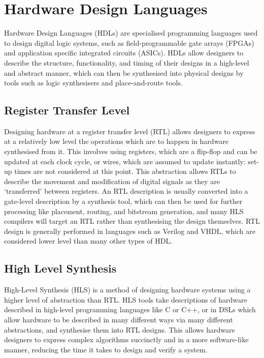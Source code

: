 \section{Hardware Design Languages}\label{hls}
Hardware Design Languages (HDLs) are specialised programming languages used to design digital logic systems, such as field-programmable gate arrays (FPGAs) and application specific integrated circuits (ASICs). HDLs allow designers to describe the structure, functionality, and timing of their designs in a high-level and abstract manner, which can then be synthesised into physical designs by tools such as logic synthesisers and place-and-route tools.

\subsection{Register Transfer Level}
Designing hardware at a register transfer level (RTL) allows designers to express at a relatively low level the operations which are to happen in hardware synthesised from it. This involves using registers, which are a flip-flop and can be updated at each clock cycle, or wires, which are assumed to update instantly: set-up times are not considered at this point. This abstraction allows RTLs to describe the movement and modification of digital signals as they are `transferred' between registers. An RTL description is usually converted into a gate-level description by a synthesis tool, which can then be used for further processing like placement, routing, and bitstream generation, and many HLS compilers will target an RTL rather than synthesising the design themselves. RTL design is generally performed in languages such as Verilog and VHDL, which are considered lower level than many other types of HDL.

\subsection{High Level Synthesis}
High-Level Synthesis (HLS) is a method of designing hardware systems using a higher level of abstraction than RTL. HLS tools take descriptions of hardware described in high-level programming languages like C or C++, or in DSLs which allow hardware to be described in many different ways via many different abstractions, and synthesise them into RTL designs. This allows hardware designers to express complex algorithms succinctly and in a more software-like manner, reducing the time it takes to design and verify a system.

